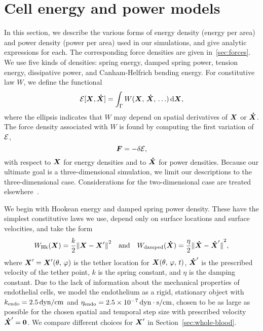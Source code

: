 \section{Cell energy and power models}\label{sec:energy}

In this section, we describe the various forms of energy density (energy per area) and
power density (power per area) used in our simulations, and give analytic expressions for
each. The corresponding force densities are given in~\ref{sec:forces}. We use five kinds
of densities: spring energy, damped spring power, tension energy, dissipative power, and
Canham-Helfrich bending energy. For constitutive law $W$, we define the functional
\begin{equation*}
    \energy[\X, \U] = \int_\interface W(\X,\,\U,\,\ldots) \d\X,
\end{equation*}
where the ellipsis indicates that $W$ may depend on spatial derivatives of $\boldsymbol{X}$ or $\boldsymbol{\dot{X}}$.
The force density associated with $W$ is found by computing the first variation of
$\mathcal{E}$,
\begin{equation}
    \boldsymbol{F} = -\delta\mathcal{E},
\end{equation}
with respect to $\boldsymbol{X}$ for energy densities and to $\boldsymbol{\dot{X}}$ for power densities. Because our
ultimate goal is a three-dimensional simulation, we limit our descriptions to the
three-dimensional case. Considerations for the two-dimensional case are treated
elsewhere~\cite{Peskin:2002go,Erickson:2010uzba}.

We begin with Hookean energy and damped spring power density. These have the simplest
constitutive laws we use, depend only on surface locations and surface velocities, and
take the form
\begin{equation}
        W_\text{Hk}(\boldsymbol{X}) = \frac{k}2 {\|\boldsymbol{X} - \boldsymbol{X}'\|}^2\quad\text{and}\quad
        W_\text{damped}(\boldsymbol{\dot{X}}) = \frac{\eta}2{\|\boldsymbol{\dot{X}} - \boldsymbol{\dot{X}}'\|}^2,
\end{equation}
where $\boldsymbol{X}'=\boldsymbol{X}'(\theta,\,\varphi)$ is the tether location for $\boldsymbol{X}(\theta,\,\varphi,\,t)$,
$\boldsymbol{\dot{X}}'$ is the prescribed velocity of the tether point, $k$ is the spring constant, and
$\eta$ is the damping constant. Due to the lack of information about the mechanical
properties of endothelial cells, we model the endothelium as a rigid, stationary object
with $\ethm{k}=2.5\dynpercm$ and $\ethm\eta=2.5\sci{-7}\dynsecpercm$, chosen to be as
large as possible for the chosen spatial and temporal step size with prescribed velocity
$\boldsymbol{\dot{X}}' = \boldsymbol{0}$. We compare different choices for $\boldsymbol{X}'$ in Section~\ref{sec:whole-blood}.

